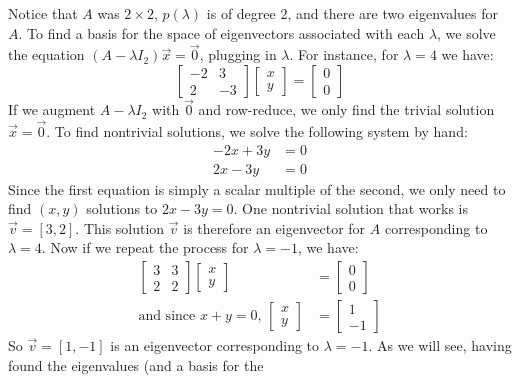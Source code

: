 \documentclass[11pt]{amsart}
\theoremstyle{definition}
\begin{document}
Notice that $A$ was $2 \times 2$, $p(\lambda)$ is of degree 2, and there are two eigenvalues for $A$. To find a basis for the space of
eigenvectors associated with each $\lambda$, we solve the equation $(A - \lambda I_2)\vec{x} = \vec{0}$, plugging in $\lambda$. 
For instance, for $\lambda = 4$ we have:
\[
	\begin{bmatrix} -2 & 3 \\ 2 & -3 \end{bmatrix}\begin{bmatrix} x \\ y \end{bmatrix} = \begin{bmatrix} 0 \\ 0 \end{bmatrix}
\]
If we augment $A - \lambda I_2$ with $\vec{0}$ and row-reduce, we only find the trivial solution $\vec{x} = \vec{0}$. To find nontrivial solutions,
we solve the following system by hand:
\begin{align*}
	-2x + 3y &= 0 \\
	2x - 3y &= 0
\end{align*}
Since the first equation is simply a scalar multiple of the second, we only need to find $(x, y)$ solutions to $2x - 3y = 0$. One nontrivial solution
that works is $\vec{v} = [3, 2]$. This solution $\vec{v}$ is therefore an eigenvector for $A$ corresponding to $\lambda = 4$. 
Now if we repeat the process for $\lambda = -1$, we have:
\begin{align*}
	\begin{bmatrix} 3 & 3 \\ 2 & 2 \end{bmatrix}\begin{bmatrix} x \\ y \end{bmatrix} &= \begin{bmatrix} 0 \\ 0 \end{bmatrix} \\
	\text{and since $x + y = 0$, } \begin{bmatrix} x \\ y \end{bmatrix} &= \begin{bmatrix} 1 \\ -1 \end{bmatrix}
\end{align*}
So $\vec{v} = [1, -1]$ is an eigenvector corresponding to $\lambda = -1$. As we will see, having found the eigenvalues (and a basis for the
\end{document}
